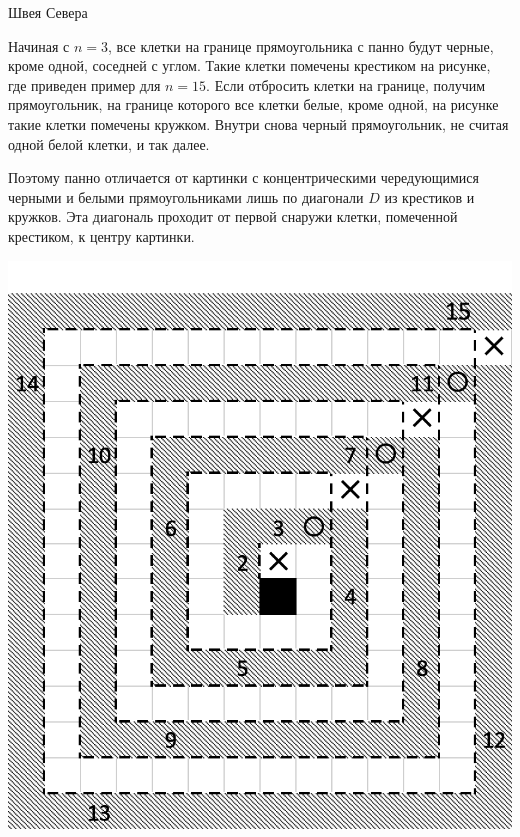 \begin{tutorial}{Швея Севера}

Начиная с $n=3$, все клетки на границе прямоугольника с панно будут черные, кроме одной, соседней с углом.  Такие клетки помечены крестиком на рисунке, где приведен пример для $n=15$. Если отбросить клетки на границе, получим прямоугольник, на границе которого все клетки белые, кроме одной, на рисунке такие клетки помечены кружком. Внутри снова черный прямоугольник, не считая одной белой клетки, и так далее. 

Поэтому панно отличается от картинки с концентрическими чередующимися черными и белыми прямоугольниками лишь по диагонали $D$ из крестиков и кружков. Эта диагональ проходит от  первой снаружи клетки, помеченной крестиком, к центру картинки.

\noindent\medskip\centerline{
\includegraphics[bb=0 0 7.2in 7in, scale=.3]{loskut_tut_1.png}
\qquad
}
\end{tutorial}
